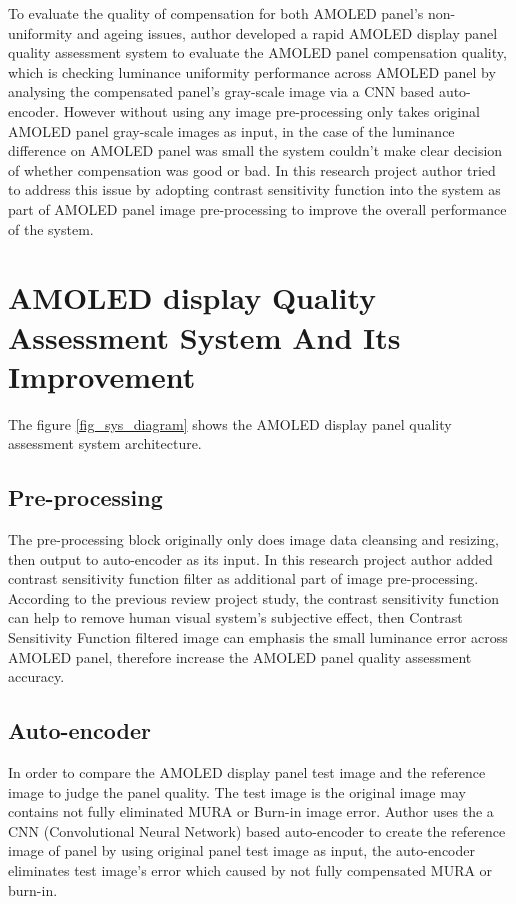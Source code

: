 \documentclass{article}
\begin{document}
To evaluate the quality of compensation for both AMOLED panel's non-uniformity and ageing issues, author developed a rapid AMOLED display panel quality assessment system to evaluate the AMOLED panel compensation quality, which is checking luminance uniformity performance across AMOLED panel by analysing the compensated panel's gray-scale image via a CNN based auto-encoder. However without using any image pre-processing only takes original AMOLED panel gray-scale images as input, in the case of the luminance difference on AMOLED panel was small the system couldn't make clear decision of whether compensation was good or bad. 
In this research project author tried to address this issue by adopting contrast sensitivity function into the system as part of AMOLED panel image pre-processing to improve the overall performance of the system. \\

\section{AMOLED display Quality Assessment System And Its Improvement }
The figure \ref{fig_sys_diagram} shows the AMOLED display panel quality assessment system architecture. 
\subsection{Pre-processing}
The pre-processing block originally only does image data cleansing and resizing, then output to auto-encoder as its input. In this research project author added contrast sensitivity function filter as additional part of image pre-processing. According to the previous review project study, the contrast sensitivity function can help to remove human visual system's subjective effect, then Contrast Sensitivity Function filtered image can emphasis the small luminance error across AMOLED panel, therefore increase the AMOLED panel quality assessment accuracy. 
\subsection{Auto-encoder}
In order to compare the AMOLED display panel test image and the reference image to judge the panel quality. The test image is the original image may contains not fully eliminated MURA or Burn-in image error. Author uses the a CNN (Convolutional Neural Network) based auto-encoder to create the reference image of panel by using original panel test image as input,  the auto-encoder eliminates test image's error which caused by not fully compensated MURA or burn-in.  
\end{document}
